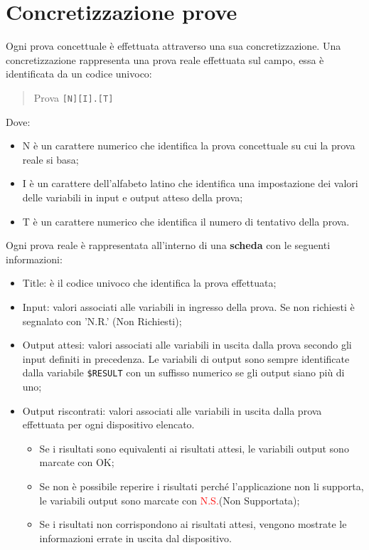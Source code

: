 \documentclass[../SperimentazioniPratiche.tex]{subfiles}
\begin{document}
\newcommand{\ok}{\textcolor{cadmiumgreen}{OK}} %
\newcommand{\ns}{\textcolor{red}{N.S.}} %
\newcommand{\nd}{\textcolor{red}{N.D.}} %

\section{Concretizzazione prove}
\label{sec:ConcretizzazioneProve}
			Ogni prova concettuale è effettuata attraverso una sua concretizzazione. Una concretizzazione rappresenta una prova reale effettuata sul campo, essa è identificata da un codice univoco:
			\begin{quote}
				\centering
				Prova \verb|[N][I].[T]|
			\end{quote}
			Dove:
			\begin{itemize}
				\item N è un carattere numerico che identifica la prova concettuale su cui la prova reale si basa;
				\item I è un carattere dell'alfabeto latino che identifica una impostazione dei valori delle variabili in input e output atteso della prova;
				\item T è un carattere numerico che identifica il numero di tentativo della prova.
			\end{itemize}
			
			Ogni prova reale è rappresentata all'interno di una \textbf{scheda} con le seguenti informazioni:
			\begin{itemize}
				\item Title: è il codice univoco che identifica la prova effettuata;
				\item Input: valori associati alle variabili in ingresso della prova. Se non richiesti è segnalato con 'N.R.' (Non Richiesti);
				\item Output attesi: valori associati alle variabili in uscita dalla prova secondo gli input definiti in precedenza. Le variabili di output sono sempre identificate dalla variabile \verb|$RESULT| con un suffisso numerico se gli output siano più di uno;
				\item Output riscontrati: valori associati alle variabili in uscita dalla prova effettuata per ogni dispositivo elencato. 
				\begin{itemize}
					\item Se i risultati sono equivalenti ai risultati attesi, le variabili output sono marcate con \ok;
					\item Se non è possibile reperire i risultati perché l'applicazione non li supporta, le variabili output sono marcate con \ns (Non Supportata);
					\item Se i risultati non corrispondono ai risultati attesi, vengono mostrate le informazioni errate in uscita dal dispositivo.
				\end{itemize}
			\end{itemize}
\end{document}
